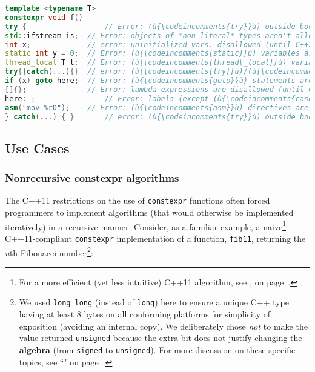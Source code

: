 \begin{lstlisting}[language=C++]
template <typename T>
constexpr void f()
try {                  // Error: (ù{\codeincomments{try}}ù) outside body isn't allowed (until C++20).
std::ifstream is;  // Error: objects of *non-literal* types aren't allowed.
int x;             // error: uninitialized vars. disallowed (until C++20)
static int y = 0;  // Error: (ù{\codeincomments{static}}ù) variables are disallowed.
thread_local T t;  // Error: (ù{\codeincomments{thread\_local}}ù) variables are disallowed.
try{}catch(...){}  // error: (ù{\codeincomments{try}}ù)/(ù{\codeincomments{catch}}ù) disallowed (until C++20)
if (x) goto here;  // Error: (ù{\codeincomments{goto}}ù) statements are disallowed.
[]{};              // Error: lambda expressions are disallowed (until C++17).
here: ;                // Error: labels (except (ù{\codeincomments{case}}ù)/(ù{\codeincomments{default}}ù)) aren't allowed.
asm("mov %r0");    // Error: (ù{\codeincomments{asm}}ù) directives are disallowed.
} catch(...) { }       // error: (ù{\codeincomments{try}}ù) outside body disallowed (until C++20)
\end{lstlisting}


\subsection[Use Cases]{Use Cases}\label{use-cases-relaxedconstexpr}

\subsubsection[Nonrecursive {\tt constexpr} algorithms]{Nonrecursive {\SubsubsecCode constexpr} algorithms}\label{non-recursive-constexpr-algorithms}

The C++11 restrictions on the use of \texttt{constexpr} functions often
forced programmers to implement algorithms (that would otherwise be
implemented iteratively) in a recursive manner. Consider, as a familiar
example, a naive{\cprotect\footnote{For a more efficient (yet less
intuitive) C++11 algorithm, see \textit{, } on page~\pageref{recursive-fibonacci}.}}
C++11-compliant \texttt{constexpr} implementation of a function,
\texttt{fib11}, returning the \emph{n}th Fibonacci number\footnote{We used \texttt{long}~\texttt{long} (instead of \texttt{long})
here to ensure a unique C++ type having at least 8 bytes on all
conforming platforms for simplicity of exposition (avoiding an internal
copy). We deliberately chose \emph{not} to make the value returned
\texttt{unsigned} because the extra bit does not justify changing the
\textbf{algebra} (from \texttt{signed} to \texttt{unsigned}). For more
discussion on these specific topics, see ``" on page~\pageref{long-long}.}:

